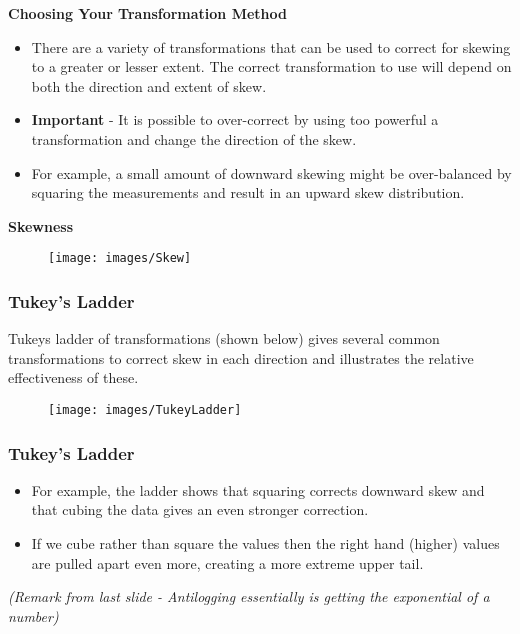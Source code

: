 \documentclass{beamer}
\begin{document}
\begin{frame}
	\large
\textbf{Choosing Your Transformation Method}
\begin{itemize}
\item There are a variety of transformations that can be used to correct for skewing to a greater or lesser extent. The correct transformation to use will depend on both the direction and extent of skew. 
\item \textbf{Important} - It is possible to over-correct by using too powerful a transformation and change the direction of the skew. \item For example, a small amount of downward skewing might be over-balanced by squaring the measurements and result in an upward skew distribution.
	\end{itemize}

\end{frame}
\begin{frame}
\textbf{Skewness}
	\begin{figure}
\centering
\texttt{[image: images/Skew]}

\end{figure}

\end{frame}
\begin{frame}
\frametitle{Tukey's Ladder}
\Large
Tukeys ladder of transformations (shown below) gives several common transformations to correct skew in each direction and illustrates the relative effectiveness of these.

\begin{figure}
\centering
\texttt{[image: images/TukeyLadder]}
\end{figure}

\end{frame}
\begin{frame}
	\frametitle{Tukey's Ladder}
	\Large
	\vspace{-1cm}
\begin{itemize}
\item For example, the ladder shows that squaring corrects downward skew and that cubing the data gives an even stronger correction. 
\item If we cube rather than square the values then the right hand (higher) values are pulled apart even more, creating a more extreme upper tail.
\end{itemize}
\bigskip
\textit{(Remark from last slide - Antilogging essentially is getting the exponential of a number)}
\end{frame}
\end{document}
